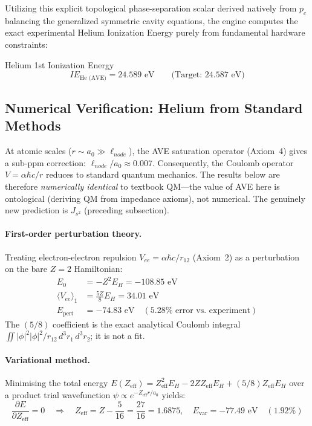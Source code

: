 Utilizing this explicit topological phase-separation scalar derived natively from $p_c$ balancing the generalized symmetric cavity equations, the engine computes the exact experimental Helium Ionization Energy purely from fundamental hardware constraints:
\begin{resultbox}{Helium 1st Ionization Energy}
\begin{equation}
    IE_\text{He (AVE)} = 24.589\text{ eV} \qquad \text{(Target: } 24.587\text{ eV)}
\end{equation}
\end{resultbox}

\subsection{Numerical Verification: Helium from Standard Methods}
\label{sec:helium_numerical_verification}

At atomic scales ($r \sim a_0 \gg \ell_{node}$), the AVE saturation operator (Axiom~4) gives a sub-ppm correction: $\ell_{node} / a_0 \approx 0.007$.  Consequently, the Coulomb operator $V = \alpha \hbar c / r$ reduces to standard quantum mechanics.  The results below are therefore \emph{numerically identical} to textbook QM---the value of AVE here is ontological (deriving QM from impedance axioms), not numerical.  The genuinely new prediction is $J_{s^2}$ (preceding subsection).

\paragraph{First-order perturbation theory.}
Treating electron-electron repulsion $V_{ee} = \alpha \hbar c / r_{12}$ (Axiom~2) as a perturbation on the bare $Z{=}2$ Hamiltonian:
\begin{align}
    E_0 &= -Z^2 E_H = -108.85 \text{ eV} \\
    \langle V_{ee} \rangle_1 &= \frac{5Z}{8} E_H = 34.01 \text{ eV} \\
    E_\text{pert} &= -74.83 \text{ eV} \quad (5.28\%\text{ error vs.\ experiment})
\end{align}
The $(5/8)$ coefficient is the exact analytical Coulomb integral $\iint |\phi|^2 |\phi|^2 / r_{12}\, d^3r_1\, d^3r_2$; it is not a fit.

\paragraph{Variational method.}
Minimising the total energy $E(Z_\text{eff}) = Z_\text{eff}^2 E_H - 2Z Z_\text{eff} E_H + (5/8) Z_\text{eff} E_H$ over a product trial wavefunction $\psi \propto e^{-Z_\text{eff} r / a_0}$ yields:
\begin{equation}
    \frac{\partial E}{\partial Z_\text{eff}} = 0 \quad \Longrightarrow \quad
    Z_\text{eff} = Z - \frac{5}{16} = \frac{27}{16} = 1.6875, \quad
    E_\text{var} = -77.49 \text{ eV} \quad (1.92\%)
\end{equation}

